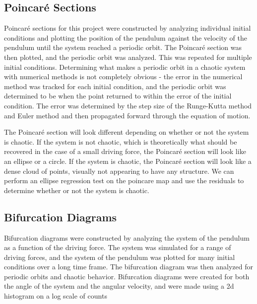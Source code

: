 \documentclass[11pt]{article} %
\begin{document}
    \subsection{Poincar\'e Sections}
        Poincar\'e sections for this project were constructed by analyzing individual initial conditions and plotting the position
        of the pendulum against the velocity of the pendulum until the system reached a periodic orbit. The Poincar\'e section was
        then plotted, and the periodic orbit was analyzed. This was repeated for multiple initial conditions. Determining what makes
        a periodic orbit in a chaotic system with numerical methods is not completely obvious - the error in the numerical method
        was tracked for each initial condition, and the periodic orbit was determined to be when the point returned to within the
        error of the initial condition. The error was determined by the step size of the Runge-Kutta method and Euler method and then
        propagated forward through the equation of motion.\\\vspace{3mm}

        The Poincar\'e section will look different depending on whether or not the system is chaotic. If the system is not chaotic,
        which is theoretically what should be recovered in the case of a small driving force, the Poincar\'e section will look like
        an ellipse or a circle. If the system is chaotic, the Poincar\'e section will look like a dense cloud of points, visually
        not appearing to have any structure. We can perform an ellipse regression test on the poincare map and use the residuals to
        determine whether or not the system is chaotic.\\
    \subsection{Bifurcation Diagrams}
        Bifurcation diagrams were constructed by analyzing the system of the pendulum as a function of the driving force. The system
        was simulated for a range of driving forces, and the system of the pendulum was plotted for many initial conditions over a 
        long time frame. The bifurcation diagram was then analyzed for periodic orbits and chaotic behavior. Bifurcation diagrams were
        created for both the angle of the system and the angular velocity, and were made using a 2d histogram on a log scale of counts\\\vspace{3mm}
\end{document}
